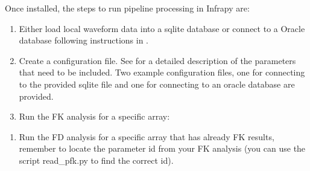 \documentclass[letterpaper,10pt,english]{sphinxmanual}
\begin{document}
Once installed, the steps to run pipeline processing in Infrapy are:
\begin{enumerate}
\def\theenumi{\arabic{enumi}}
\def\labelenumi{\theenumi .}
\makeatletter\def\p@enumii{\p@enumi \theenumi .}\makeatother
\item {} 
Either load local waveform data into a sqlite database or connect to a Oracle database following instructions in {\hyperref[\detokenize{pisces:pisces}]{}}.

\item {} 
Create a configuration file. See {\hyperref[\detokenize{config:config}]{}} for a detailed description of the parameters that need to be included. Two example configuration files, one for connecting to the provided sqlite file and one for connecting to an oracle database are provided.

\item {} 
Run the FK analysis for a specific array:

\end{enumerate}

\begin{sphinxVerbatim}[commandchars=\\\{\}]
    
\end{sphinxVerbatim}
\begin{enumerate}
\def\theenumi{\arabic{enumi}}
\def\labelenumi{\theenumi .}
\makeatletter\def\p@enumii{\p@enumi \theenumi .}\makeatother
\setcounter{enumi}{3}
\item {} 
Run the FD analysis for a specific array that has already FK results, remember to locate the parameter id from your FK analysis (you can use the script read\_pfk.py to find the correct id).

\end{enumerate}

\begin{sphinxVerbatim}[commandchars=\\\{\}]
      

           

  

        
\end{sphinxVerbatim}
\end{document}
